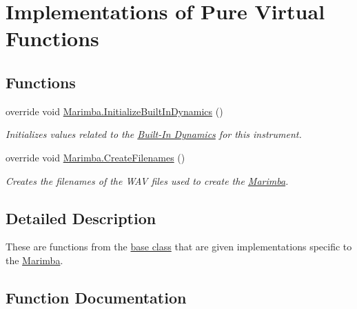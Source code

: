 \hypertarget{group___mar_virt_func}{}\section{Implementations of Pure Virtual Functions}
\label{group___mar_virt_func}
\subsection*{Functions}
\begin{DoxyCompactItemize}
\item 
override void \hyperlink{group___mar_virt_func_ga293d829cb8571c21452c23e90968b2d8}{Marimba.\+Initialize\+Built\+In\+Dynamics} ()
\begin{DoxyCompactList}\small\item\em Initializes values related to the \hyperlink{group___audio_DefBID}{Built-\/\+In Dynamics} for this instrument. \end{DoxyCompactList}\item 
override void \hyperlink{group___mar_virt_func_gae57d9737fd07708dc7e13e74ee777878}{Marimba.\+Create\+Filenames} ()
\begin{DoxyCompactList}\small\item\em Creates the filenames of the W\+AV files used to create the \hyperlink{class_marimba}{Marimba}. \end{DoxyCompactList}\end{DoxyCompactItemize}


\subsection{Detailed Description}
These are functions from the \hyperlink{group___v_i_base}{base class} that are given implementations specific to the \hyperlink{class_marimba}{Marimba}. 

\subsection{Function Documentation}
\mbox{\label{group___mar_virt_func_gae57d9737fd07708dc7e13e74ee777878}} 
